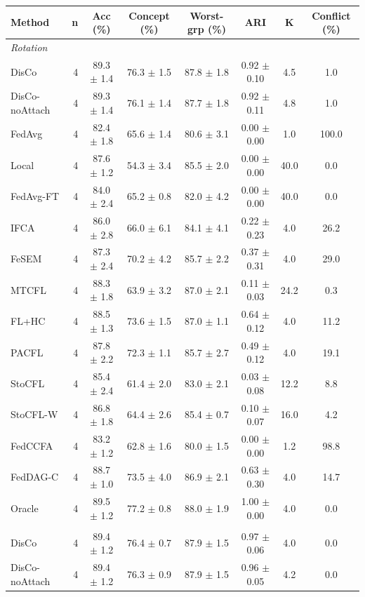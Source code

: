 {\scriptsize
\begin{tabular}{l r c c c c c c}
\toprule
Method & n & Acc (\%) & Concept (\%) & Worst-grp (\%) & ARI & K & Conflict (\%) \\
\midrule
\multicolumn{8}{l}{\textit{Rotation}} \\
DisCo & 4 & 89.3 $\pm$ 1.4 & 76.3 $\pm$ 1.5 & 87.8 $\pm$ 1.8 & 0.92 $\pm$ 0.10 & 4.5 & 1.0 \\
DisCo-noAttach & 4 & 89.3 $\pm$ 1.4 & 76.1 $\pm$ 1.4 & 87.7 $\pm$ 1.8 & 0.92 $\pm$ 0.11 & 4.8 & 1.0 \\
FedAvg & 4 & 82.4 $\pm$ 1.8 & 65.6 $\pm$ 1.4 & 80.6 $\pm$ 3.1 & 0.00 $\pm$ 0.00 & 1.0 & 100.0 \\
Local & 4 & 87.6 $\pm$ 1.2 & 54.3 $\pm$ 3.4 & 85.5 $\pm$ 2.0 & 0.00 $\pm$ 0.00 & 40.0 & 0.0 \\
FedAvg-FT & 4 & 84.0 $\pm$ 2.4 & 65.2 $\pm$ 0.8 & 82.0 $\pm$ 4.2 & 0.00 $\pm$ 0.00 & 40.0 & 0.0 \\
IFCA & 4 & 86.0 $\pm$ 2.8 & 66.0 $\pm$ 6.1 & 84.1 $\pm$ 4.1 & 0.22 $\pm$ 0.23 & 4.0 & 26.2 \\
FeSEM & 4 & 87.3 $\pm$ 2.4 & 70.2 $\pm$ 4.2 & 85.7 $\pm$ 2.2 & 0.37 $\pm$ 0.31 & 4.0 & 29.0 \\
MTCFL & 4 & 88.3 $\pm$ 1.8 & 63.9 $\pm$ 3.2 & 87.0 $\pm$ 2.1 & 0.11 $\pm$ 0.03 & 24.2 & 0.3 \\
FL+HC & 4 & 88.5 $\pm$ 1.3 & 73.6 $\pm$ 1.5 & 87.0 $\pm$ 1.1 & 0.64 $\pm$ 0.12 & 4.0 & 11.2 \\
PACFL & 4 & 87.8 $\pm$ 2.2 & 72.3 $\pm$ 1.1 & 85.7 $\pm$ 2.7 & 0.49 $\pm$ 0.12 & 4.0 & 19.1 \\
StoCFL & 4 & 85.4 $\pm$ 2.4 & 61.4 $\pm$ 2.0 & 83.0 $\pm$ 2.1 & 0.03 $\pm$ 0.08 & 12.2 & 8.8 \\
StoCFL-W & 4 & 86.8 $\pm$ 1.8 & 64.4 $\pm$ 2.6 & 85.4 $\pm$ 0.7 & 0.10 $\pm$ 0.07 & 16.0 & 4.2 \\
FedCCFA & 4 & 83.2 $\pm$ 1.2 & 62.8 $\pm$ 1.6 & 80.0 $\pm$ 1.5 & 0.00 $\pm$ 0.00 & 1.2 & 98.8 \\
FedDAG-C & 4 & 88.7 $\pm$ 1.0 & 73.5 $\pm$ 4.0 & 86.9 $\pm$ 2.1 & 0.63 $\pm$ 0.30 & 4.0 & 14.7 \\
Oracle & 4 & 89.5 $\pm$ 1.2 & 77.2 $\pm$ 0.8 & 88.0 $\pm$ 1.9 & 1.00 $\pm$ 0.00 & 4.0 & 0.0 \\
\addlinespace
\multicolumn{8}{l}{\textit{Label swap}} \\
DisCo & 4 & 89.4 $\pm$ 1.2 & 76.4 $\pm$ 0.7 & 87.9 $\pm$ 1.5 & 0.97 $\pm$ 0.06 & 4.0 & 0.0 \\
DisCo-noAttach & 4 & 89.4 $\pm$ 1.2 & 76.3 $\pm$ 0.9 & 87.9 $\pm$ 1.5 & 0.96 $\pm$ 0.05 & 4.2 & 0.0 \\

\end{tabular}}
